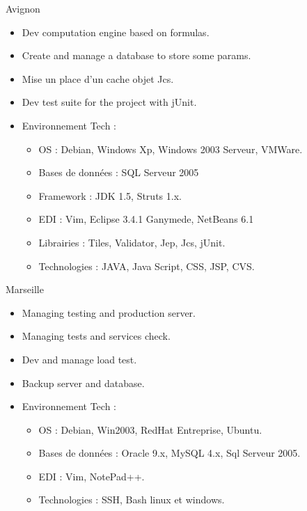 \documentclass[10pt,a4paper,sans]{moderncv}
\begin{document}
{Avignon}{
  \begin{itemize}%
    \item Dev computation engine based on formulas.
    \item Create and manage a database to store some params.
    \item Mise un place d'un cache objet Jcs.
    \item Dev test suite for the project with jUnit.
    \item Environnement Tech :
      \begin{itemize}%
        \item OS : Debian, Windows Xp, Windows 2003 Serveur, VMWare.
        \item Bases de données : SQL Serveur 2005
        \item Framework : JDK 1.5,  Struts 1.x.
        \item EDI : Vim, Eclipse 3.4.1 Ganymede, NetBeans 6.1
        \item Librairies : Tiles, Validator, Jep, Jcs, jUnit.
        \item Technologies : JAVA, Java Script, CSS, JSP, CVS.
      \end{itemize}
  \end{itemize}}

{Marseille}{
  \begin{itemize}%
    \item Managing testing and production server.
    \item Managing tests and services check.
    \item Dev and manage load test.
    \item Backup server and database.
    \item Environnement Tech :
      \begin{itemize}%
        \item OS : Debian, Win2003, RedHat Entreprise, Ubuntu.
        \item Bases de données : Oracle 9.x, MySQL 4.x, Sql Serveur 2005.
        \item EDI : Vim, NotePad++.
        \item Technologies : SSH, Bash linux et windows.
      \end{itemize}
  \end{itemize}}
\end{document}
